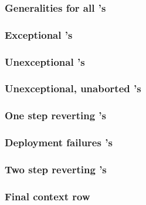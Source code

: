 \subsubsection{Generalities for all 's     \lispDone{}}  \label{hub: instruction handling: create: generalities: all}                         
\subsubsection{Exceptional 's              \lispDone{}}  \label{hub: instruction handling: create: generalities: exceptional}                 
\subsubsection{Unexceptional 's            \lispDone{}}  \label{hub: instruction handling: create: generalities: unexceptional}               
\subsubsection{Unexceptional, unaborted 's \lispDone{}}  \label{hub: instruction handling: create: generalities: unexceptional, unaborted}    
\subsubsection{One step reverting 's       \lispDone{}}  \label{hub: instruction handling: create: generalities: simply reverting}            
\subsubsection{Deployment failures 's      \lispDone{}}  \label{hub: instruction handling: create: generalities: deployment failures}         
\subsubsection{Two step reverting 's       \lispDone{}}  \label{hub: instruction handling: create: generalities: reverted deployment failure} 
\subsubsection{Final context row                        \lispDone{}}  \label{hub: instruction handling: create: generalities: final context row}           
